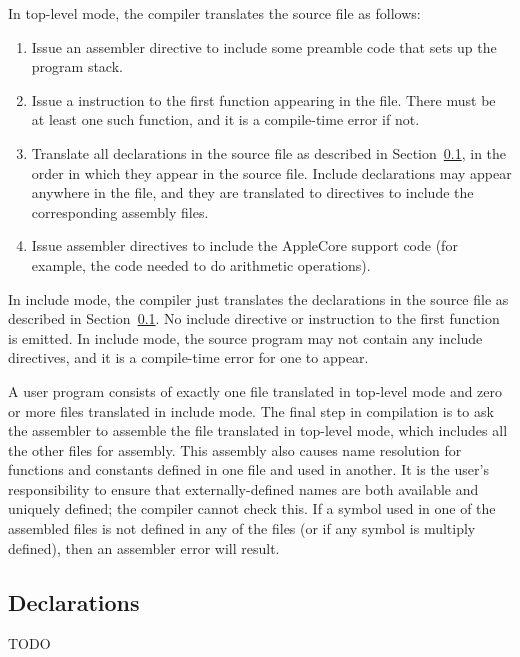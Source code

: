 \documentclass[10pt]{article}
\begin{document}
  In top-level mode, the compiler translates
the source file as follows:
%
\begin{enumerate}
%
\item Issue an assembler directive to include some preamble code that
  sets up the program stack.
%
\item Issue a  instruction to the first function appearing in
  the file.  There must be at least one such function, and it is a
  compile-time error if not.
%
\item Translate all declarations in the source file as described in
  Section~\ref{sec:code-gen:declarations}, in the order in which they
  appear in the source file.  Include declarations may appear anywhere
  in the file, and they are translated to directives to include the
  corresponding assembly files.
%
\item Issue assembler directives to include the AppleCore support code
  (for example, the code needed to do arithmetic operations).
%
\end{enumerate}

 In include mode, the compiler just translates
the declarations in the source file as described in
Section~\ref{sec:code-gen:declarations}.  No include directive or
 instruction to the first function is emitted.  In include
mode, the source program may not contain any include directives, and
it is a compile-time error for one to appear.

 A user program consists
of exactly one file translated in top-level mode and zero or more
files translated in include mode.  The final step in compilation is to
ask the assembler to assemble the file translated in top-level mode,
which includes all the other files for assembly.  This assembly also
causes name resolution for functions and constants defined in one file
and used in another.  It is the user's responsibility to ensure that
externally-defined names are both available and uniquely defined; the
compiler cannot check this.  If a symbol used in one of the assembled
files is not defined in any of the files (or if any symbol is multiply
defined), then an assembler error will result.

\subsection{Declarations}
\label{sec:code-gen:declarations}

TODO
\end{document}

